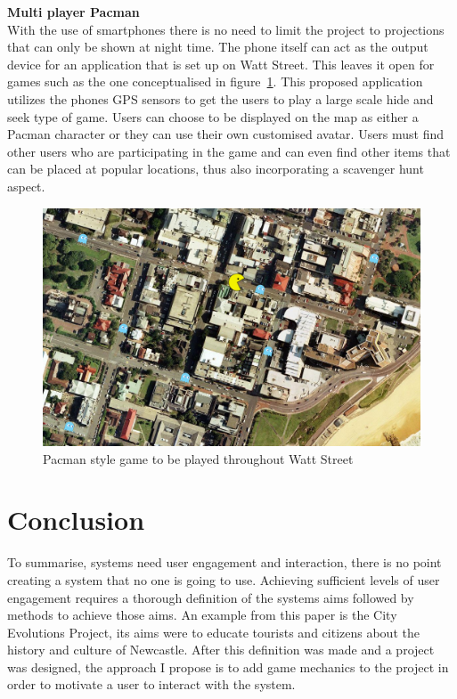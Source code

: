 \documentclass[a4paper,12pt]{article}
\begin{document}
\par\textbf{Multi player Pacman}\\
With the use of smartphones there is no need to limit the project to projections that can only be shown at night time.
The phone itself can act as the output device for an application that is set up on Watt Street. 
This leaves it open for games such as the one conceptualised in figure~\ref{application-pacman}.
This proposed application utilizes the phones GPS sensors to get the users to play a large scale hide and seek type of game.
Users can choose to be displayed on the map as either a Pacman character or they can use their own customised avatar.
Users must find other users who are participating in the game and can even find other items that can be placed at popular locations, thus also incorporating a scavenger hunt aspect.
\begin{figure}[ht!]
	\centering
	\includegraphics[width=125mm]{./images/pacman}
	\caption{Pacman style game to be played throughout Watt Street}
	\label{application-pacman}
\end{figure}


%
%

\section{Conclusion}
To summarise, systems need user engagement and interaction, there is no point creating a system that no one is going to use.
Achieving sufficient levels of user engagement requires a thorough definition of the systems aims followed by methods to achieve those aims. 
An example from this paper is the City Evolutions Project, its aims were to educate tourists and citizens about the history and culture of Newcastle.
After this definition was made and a project was designed, the approach I propose is to add game mechanics to the project in order to motivate a user to interact with the system.
\end{document}
